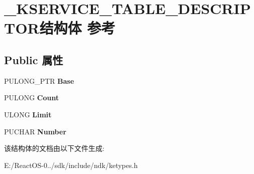\hypertarget{struct___k_s_e_r_v_i_c_e___t_a_b_l_e___d_e_s_c_r_i_p_t_o_r}{}\section{\+\_\+\+K\+S\+E\+R\+V\+I\+C\+E\+\_\+\+T\+A\+B\+L\+E\+\_\+\+D\+E\+S\+C\+R\+I\+P\+T\+O\+R结构体 参考}
\label{struct___k_s_e_r_v_i_c_e___t_a_b_l_e___d_e_s_c_r_i_p_t_o_r}
\subsection*{Public 属性}
\begin{DoxyCompactItemize}
\item 
\mbox{\label{struct___k_s_e_r_v_i_c_e___t_a_b_l_e___d_e_s_c_r_i_p_t_o_r_a9e42a939b45034bbaf949c5343eb6d80}} 
P\+U\+L\+O\+N\+G\+\_\+\+P\+TR {\bfseries Base}
\item 
\mbox{\label{struct___k_s_e_r_v_i_c_e___t_a_b_l_e___d_e_s_c_r_i_p_t_o_r_a5971508c98dedbd7e1c905d2a7c6ce1a}} 
P\+U\+L\+O\+NG {\bfseries Count}
\item 
\mbox{\label{struct___k_s_e_r_v_i_c_e___t_a_b_l_e___d_e_s_c_r_i_p_t_o_r_ac6384f590cc9b83f4be4e544e2dfb31b}} 
U\+L\+O\+NG {\bfseries Limit}
\item 
\mbox{\label{struct___k_s_e_r_v_i_c_e___t_a_b_l_e___d_e_s_c_r_i_p_t_o_r_ac9f8b2d0121efed3b9436913eaea4e38}} 
P\+U\+C\+H\+AR {\bfseries Number}
\end{DoxyCompactItemize}


该结构体的文档由以下文件生成\+:\begin{DoxyCompactItemize}
\item 
E\+:/\+React\+O\+S-\/0../sdk/include/ndk/ketypes.\+h\end{DoxyCompactItemize}
